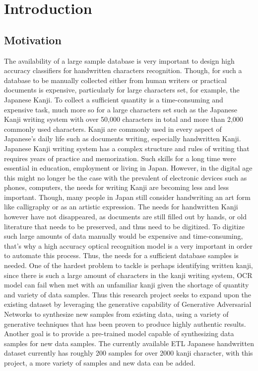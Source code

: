 \documentclass[12pt]{report}
\begin{document}
\newpage
{}
\listoffigures

\newpage
{}
\setcounter{page}{1}
\chapter{Introduction}
\label{chap:intro}

\section{Motivation}
The availability of a large sample database is very important to design high accuracy
classifiers for handwritten characters recognition. Though, for such a database to be manually collected either from human writers or practical documents is expensive, particularly for large characters set, for example, the Japanese Kanji. To
collect a sufficient quantity is a time-consuming and expensive task, much more so
for a large characters set such as the Japanese Kanji writing system with over 50,000
characters in total and more than 2,000 commonly used characters. Kanji are
commonly used in every aspect of Japanese’s daily life such as documents writing,
especially handwritten Kanji.
Japanese Kanji writing system has a complex structure and rules of writing that
requires years of practice and memorization. Such skills for a long time were
essential in education, employment or living in Japan. However, in the digital age
this might no longer be the case with the prevalent of electronic devices such as
phones, computers, the needs for writing Kanji are becoming less and less important.
Though, many people in Japan still consider handwriting an art form like calligraphy
or as an artistic expression. The needs for handwritten Kanji however have not
disappeared, as documents are still filled out by hands, or old literature that needs to be preserved, and thus need to be digitized. To digitize such large amounts of data manually would be expensive and time-consuming, that’s
why a high accuracy optical recognition model is a very important in order to
automate this process. Thus, the needs for a sufficient database samples is needed.
One of the hardest problem to tackle is perhaps identifying written kanji, since there
is such a large amount of characters in the kanji writing system, OCR model can fail
when met with an unfamiliar kanji given the shortage of quantity and variety of data
samples. Thus this research project seeks to expand upon the existing dataset by
leveraging the generative capability of Generative Adversarial Networks to
synthesize new samples from existing data, using a variety of generative techniques
that has been proven to produce highly authentic results. Another goal is to provide
a pre-trained model capable of synthesizing data samples for new data samples.
The currently available ETL Japanese handwritten dataset \cite{etl} currently has roughly 200
samples for over 2000 kanji character, with this project, a more variety of samples
and new data can be added.
\end{document}
